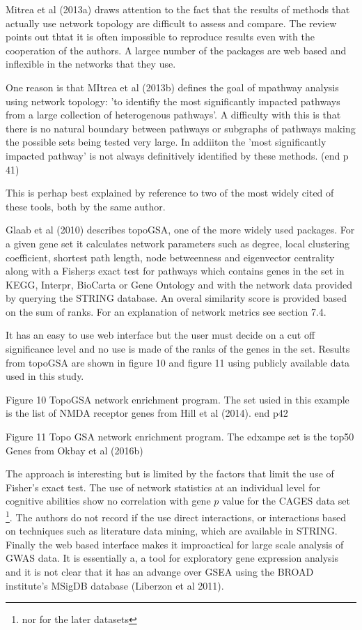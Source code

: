 Mitrea et al (2013a) draws attention to the fact that the results of methods that actually use network topology are difficult to assess and compare. The review points out thtat it is often impossible to reproduce results even with the cooperation of the authors. A largee number of the packages are web based and inflexible in the networks that they use.

One reason is that MItrea et al (2013b) defines the goal of mpathway analysis using network topology: 'to identifiy the most significantly impacted pathways from a large collection of heterogenous pathways'. A difficulty with this is that there is no natural boundary between pathways or subgraphs of pathways making the possible sets being tested very large. In addiiton the 'most significantly impacted pathway' is not always definitively identified by these methods.  (end p 41)

This is perhap best explained by reference to two of the most widely cited of these tools, both by the same author. 

Glaab et al (2010) describes topoGSA, one of the more widely used packages. For a given gene set it calculates network parameters such as degree, local clustering coefficient, shortest path length, node betweenness and eigenvector centrality along with a Fisher;s exact test for pathways which contains genes in the set in KEGG, Interpr, BioCarta or Gene Ontology and with the network data provided by querying the STRING database. An overal similarity score is provided based on the sum of ranks. For an explanation of network metrics see section 7.4.

It has an easy to use web interface but the user must decide on a cut off significance level and no use is made of the ranks of the genes in the set. Results from topoGSA are shown in figure 10 and figure 11 using publicly available data used in this study.

Figure 10 TopoGSA network enrichment program. The set usied in this example is the list of NMDA receptor genes from Hill et al (2014). end p42

Figure 11 Topo GSA network enrichment program. The edxampe set is the top50 Genes from Okbay et al (2016b)

The approach is interesting but is limited by the factors that limit the use of Fisher's exact test. The use of network statistics at an individual level for cognitive abilities show no correlation with gene $p$ value for the CAGES data set \footnote{nor for the later datasets}. The authors do not record if the use direct interactions, or interactions based on techniques such as literature data mining, which are available in STRING. Finally the web based interface makes it improactical for large scale analysis of GWAS data. It is essentially a, a tool for exploratory gene expression analysis and it is not clear that it has an advange over GSEA using the BROAD institute's MSigDB database (Liberzon et al 2011). 

